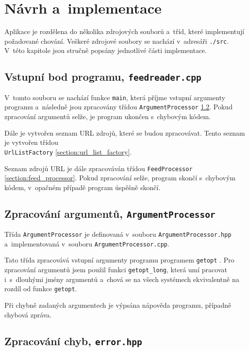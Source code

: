 \documentclass[a4paper, 11pt]{article}
\begin{document}
	\section{Návrh a~implementace}

	Aplikace je rozdělena do několika zdrojových souborů a~tříd, které
	implementují požadované chování. Veškeré zdrojové soubory se nachází
	v~adresáři \texttt{./src}. V~této kapitole jsou stručně popsány jednotlivé
	části implementace.


	\subsection{Vstupní bod programu, \texttt{feedreader.cpp}}

	V~tomto souboru se nachází funkce \texttt{main}, která příjme vstupní
	argumenty programu a~následně jsou zpracovány třídou
	\texttt{ArgumentProcessor} \ref{section:argument_processor}.
	Pokud zpracování argumentů selže, je program ukončen s~chybovým kódem.

	Dále je vytvořen seznam URL zdrojů, které se budou zpracovávat. Tento
	seznam je vytvořen třídou
	\\ \texttt{UrlListFactory} \ref{section:url_list_factory}.

	Seznam zdrojů URL je dále zpracováván třídou \texttt{FeedProcessor}
	\ref{section:feed_processor}. Pokud zpracování selže, program skončí
	s~chybovým kódem, v~opačném případě program úspěšně skončí.


	\subsection{Zpracování argumentů, \texttt{ArgumentProcessor}}
	\label{section:argument_processor}

	Třída \texttt{ArgumentProcessor} je definovaná v~souboru
	\texttt{ArgumentProcessor.hpp} a~implementovaná v~souboru
	\texttt{ArgumentProcessor.cpp}.

	Tato třída zpracovává vstupní argumenty programu programem \texttt{getopt}
	\cite{getopt}. Pro zpracování argumentů jsem použil funkci
	\texttt{getopt\_long}, která umí pracovat i~s~dlouhými jmény argumentů
	a~chová se na všech systémech ekvivalentně na rozdíl od funkce
	\texttt{getopt}.

	Při chybně zadaných argumentech je výpsána nápověda programu, případně
	chybová zpráva.


	\subsection{Zpracování chyb, \texttt{error.hpp}}
\end{document}
